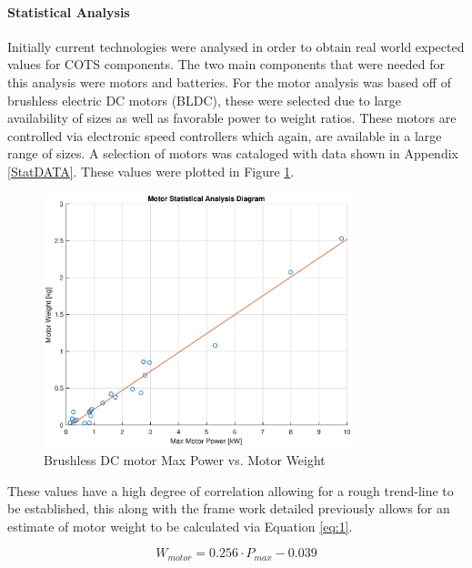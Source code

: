 \paragraph{Statistical Analysis}
Initially current technologies were analysed in order to obtain real world expected values for COTS components. The two main components that were needed for this analysis were motors and batteries. For the motor analysis was based off of brushless electric DC motors (BLDC), these were selected due to large availability of sizes as well as favorable power to weight ratios. These motors are controlled via electronic speed controllers which again, are available in a large range of sizes. A selection of motors was cataloged with data shown in Appendix \ref{StatDATA}. These values were plotted in Figure \ref{fig:statmot}.

\begin{figure}[H]
    \centering
    \includegraphics[width = 0.8\textwidth]{PrelimSizing/motors.eps}
    \caption{Brushless DC motor Max Power vs. Motor Weight}
    \label{fig:statmot}
\end{figure}

These values have a high degree of correlation allowing for a rough trend-line to be established, this along with the frame work detailed previously allows for an estimate of motor weight to be calculated via Equation \ref{eq:1}. 

\begin{equation}
    W_{motor} = 0.256\cdot P_{max} - 0.039
    \label{eq:1}
\end{equation}



